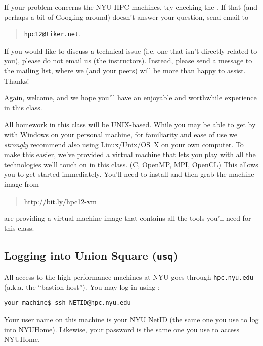 \documentclass[11pt]{article}
\begin{document}
\begin{enumerate}
If your problem concerns the NYU HPC machines, try checking the
.
If that (and perhaps a bit of Googling around) doesn't answer your
question, send email to
\begin{quote}
  \href{mailto:hpc12@tiker.net}{\texttt{hpc12@tiker.net}}.
\end{quote}

If you would like to discuss a technical issue (i.e. one that isn't
directly related to you), please do not email us (the instructors).
Instead, please send a message to the mailing list, where we (and your
peers) will be more than happy to assist.  Thanks!

Again, welcome, and we hope you'll have an enjoyable and worthwhile
experience in this class.

\begin{note}
All homework in this class will be UNIX-based. While you
may be able to get by with Windows on your personal machine, for
familiarity and ease of use we \emph{strongly} recommend also using
Linux/Unix/OS~X on your own computer.
To make this easier, we've provided a virtual machine that lets you
play with all the technologies we'll touch on in this class. (C,
OpenMP, MPI, OpenCL) This allows you to get started immediately.
You'll need to install 
and then grab the machine image from

\begin{quote}
  \url{http://bit.ly/hpc12-vm}
\end{quote}

are providing a virtual machine image that
contains all the tools you'll need for this class.
\end{note}

\subsection*{Logging into Union Square (\texttt{usq})}

All access to the high-performance machines at NYU goes through
\texttt{hpc.nyu.edu} (a.k.a. the ``bastion host''). You may log in using
:
\begin{lstlisting}
your-machine$ ssh NETID@hpc.nyu.edu
\end{lstlisting}
Your user name on this machine is your NYU NetID (the same one you use
to log into NYUHome). Likewise, your password is the same one you use
to access NYUHome.


\end{enumerate}
\end{document}
